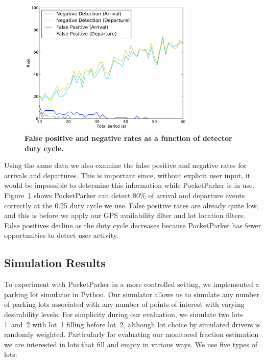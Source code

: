 \begin{figure}
\centering
\includegraphics[width=3.325in]{./figures/Rate_FP_and_ND.pdf}

\caption{\textbf{False positive and negative rates as a function of detector
duty cycle.}} 

\label{fig-falsepositives}
\end{figure}

Using the same data we also examine the false positive and negative rates for
arrivals and departures. This is important since, without explicit user
input, it would be impossible to determine this information while
PocketParker is in use. Figure~\ref{fig-falsepositives} shows PocketParker
can detect 80\% of arrival and departure events correctly at the 0.25 duty
cycle we use. False positive rates are already quite low, and this is before
we apply our GPS availability filter and lot location filters. False
positives decline as the duty cycle decreases because PocketParker has fewer
opportunities to detect user activity.

\subsection{Simulation Results}
\label{subsec-simulator}

To experiment with PocketParker in a more controlled setting, we implemented
a parking lot simulator in Python. Our simulator allows us to simulate any
number of parking lots associated with any number of points of interest with
varying desirability levels. For simplicity during our evaluation, we
simulate two lots 1~and~2 with lot~1 filling before lot~2, although lot
choice by simulated drivers is randomly weighted. Particularly for evaluating
our monitored fraction estimation we are interested in lots that fill and
empty in various ways. We use five types of lots:

